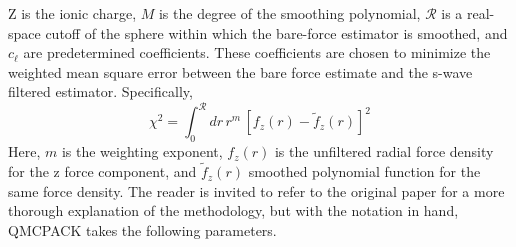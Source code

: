 Z is the ionic charge, $M$ is the degree of the smoothing polynomial, $\mathcal{R}$ is a real-space cutoff of the sphere within which the bare-force estimator is smoothed, and $c_\ell$ are predetermined coefficients.  These coefficients are chosen to minimize the weighted mean square error between the bare force estimate and the s-wave filtered estimator.  Specifically, 
\begin{equation}
\chi^2 = \int_0^\mathcal{R}dr\,r^m\,[f_z(r) - \tilde{f}_z(r)]^2
\end{equation}
Here, $m$ is the weighting exponent, $f_z(r)$ is the unfiltered radial force density for the z force component, and $\tilde{f}_z(r)$ smoothed polynomial function for the same force density.  The reader is invited to refer to the original paper for a more thorough explanation of the methodology, but with the notation in hand, QMCPACK takes the following parameters.
\FloatBarrier
